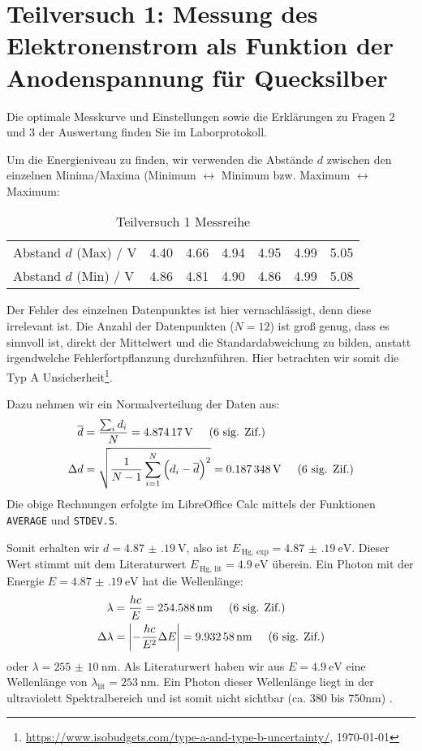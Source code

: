 \section{Teilversuch 1: Messung des Elektronenstrom als Funktion der Anodenspannung für Quecksilber}
	Die optimale Messkurve und Einstellungen sowie die Erklärungen zu Fragen 2 und 3 der Auswertung finden Sie im Laborprotokoll.

	Um die Energieniveau zu finden, wir verwenden die Abstände $d$ zwischen den einzelnen Minima/Maxima (Minimum $\leftrightarrow$ Minimum bzw. Maximum $\leftrightarrow$ Maximum:

	\begin{table}[!ht]
		\centering
		\begin{tabular}{l | *{6}{r}}
			\toprule
			Abstand $d$ (Max) / \si{\volt} & \num{4.40} & \num{4.66} & \num{4.94} & \num{4.95} & \num{4.99} & \num{5.05} \\
			Abstand $d$ (Min) / \si{\volt} & \num{4.86} & \num{4.81} & \num{4.90} & \num{4.86} & \num{4.99} & \num{5.08} \\
			\bottomrule
		\end{tabular}
		\caption{Teilversuch 1 Messreihe}
		\label{table:tv1}
	\end{table}

	Der Fehler des einzelnen Datenpunktes ist hier vernachlässigt, denn diese irrelevant ist. Die Anzahl der Datenpunkten ($N = 12$) ist groß genug, dass es sinnvoll ist, direkt der Mittelwert und die Standardabweichung zu bilden, anstatt irgendwelche Fehlerfortpflanzung durchzuführen. Hier betrachten wir somit die Typ A Unsicherheit\footnote{\url{https://www.isobudgets.com/type-a-and-type-b-uncertainty/}, \today}.

	Dazu nehmen wir ein Normalverteilung der Daten aus:
	\begin{align}
		\overline{d} &= \frac{\sum_i{d_i}}{N} = \SI{4.87417}{\volt} \hspace{0.5cm}\text{(6 sig. Zif.)}\\
		\Delta d &= \sqrt{\frac{1}{N-1} \sum_{i=1}^N \left(d_i - \overline{d}\right)^2} = \SI{0.187348}{\volt} \hspace{0.5cm}\text{(6 sig. Zif.)}
	\end{align}
	Die obige Rechnungen erfolgte im LibreOffice Calc mittels der Funktionen \texttt{AVERAGE} und \texttt{STDEV.S}. 

	Somit erhalten wir $d = \SI{4.87(19)}{\volt}$, also ist $E_{\,\text{Hg, exp}} = \SI{4.87(19)}{\electronvolt}$. Dieser Wert stimmt mit dem Literaturwert $E_{\,\text{Hg, lit}} = \SI{4.9}{\electronvolt}$ überein.
	\newpage
	Ein Photon mit der Energie $E = \SI{4.87(19)}{\electronvolt}$ hat die Wellenlänge:
	\begin{align}
		\lambda &= \frac{hc}{E} = \SI{254.588}{\nano\meter} \hspace{0.5cm}\text{(6 sig. Zif.)} \\
		\Delta \lambda &= \abs{-\frac{hc}{E^2}\Delta E} = \SI{9.93258}{\nano\meter} \hspace{0.5cm}\text{(6 sig. Zif.)}
	\end{align}
	oder $\lambda = \SI{255(10)}{\nano\meter}$. Als Literaturwert haben wir aus $E = \SI{4.9}{\electronvolt}$ eine Wellenlänge von $\lambda_\text{lit} = \SI{253}{\nano\meter}$. Ein Photon dieser Wellenlänge liegt in der ultraviolett Spektralbereich und ist somit nicht sichtbar (ca. \num{380} bis \num{750}\si{\nano\meter}) \citep{starr_biology_2006}. 

